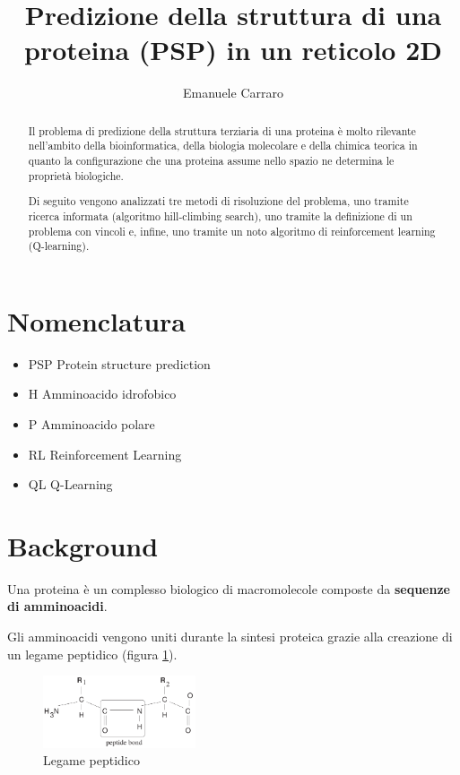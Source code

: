 \documentclass[conference]{IEEEtran}
\title{Predizione della struttura di una proteina (PSP) in un reticolo 2D}
\author{Emanuele Carraro}
\begin{document}
\maketitle    

\begin{abstract}
Il problema di predizione della struttura terziaria di una proteina è molto rilevante nell'ambito della bioinformatica, della biologia molecolare e della chimica teorica in quanto la configurazione che una proteina assume nello spazio ne determina le proprietà biologiche.

Di seguito vengono analizzati tre metodi di risoluzione del problema, uno tramite ricerca informata (algoritmo hill-climbing search), uno tramite la definizione di un problema con vincoli e, infine, uno tramite un noto algoritmo di reinforcement learning (Q-learning).
\end{abstract}

\section{Nomenclatura}

\begin{itemize}
 \item PSP Protein structure prediction
 \item H Amminoacido idrofobico
 \item P Amminoacido polare
 \item RL Reinforcement Learning
 \item QL Q-Learning
\end{itemize}

\section{Background}

Una proteina è un complesso biologico di macromolecole composte da \textbf{sequenze di amminoacidi}.

Gli amminoacidi vengono uniti durante la sintesi proteica grazie alla creazione di un legame peptidico (figura \ref{fig:pept}).

\begin{figure}[h]
\centering
\includegraphics[width=0.4\textwidth]{figure/peptideBond.png}
\caption{Legame peptidico}
\label{fig:pept}
\end{figure}
\end{document}
